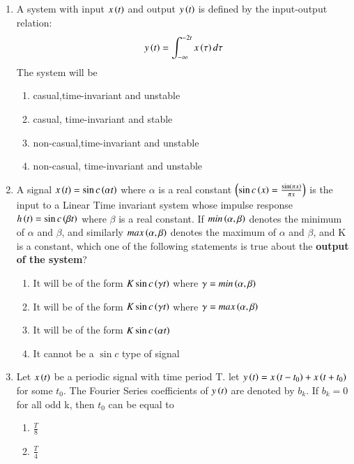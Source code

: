 \documentclass[journal,12pt,onecolumn]{IEEEtran}
\theoremstyle{remark}
\begin{document}
\begin{enumerate}
\begin{enumerate}
      \end{enumerate}
      \item A system with input $x\left(t\right)$ and output $y\left(t\right)$ is defined by the input-output relation:
      \begin{align}
          y\left(t\right)=\int_{-\infty}^{-2t}x\left(\tau\right)d\tau
      \end{align}
      The system will be 
      \begin{enumerate}
          \item casual,time-invariant and unstable
          \item casual, time-invariant and stable
          \item non-casual,time-invariant and unstable
          \item non-casual, time-invariant and unstable
      \end{enumerate}
      \item A signal $x\left(t\right)=\sin c\left(\alpha t\right)$ where $\alpha$ is a real constant $\left(\sin c\left(x\right)=\frac{\sin\left(\pi x\right)}{\pi x}\right)$ is the input to a Linear Time invariant system whose impulse response $h\left(t\right)=\sin c\left(\beta t\right)$ where $\beta$ is a real constant. If $min\left(\alpha,\beta\right)$ denotes the minimum of $\alpha$ and $\beta$, and similarly $max\left(\alpha,\beta\right)$ denotes the maximum of $\alpha$ and $\beta$, and K is a constant, which one of the following statements is true about the \textbf{output of the system}?
      \begin{enumerate}
          \item It will be of the form $K\sin c\left(\gamma t\right)$ where $\gamma=min\left(\alpha,\beta\right)$
           \item It will be of the form $K\sin c\left(\gamma t\right)$ where $\gamma=max\left(\alpha,\beta\right)$
           \item It will be of the form $K \sin c\left(\alpha t\right)$
           \item It cannot be a $\sin c$ type of signal
      \end{enumerate}
      \item Let $x\left(t\right)$ be  a periodic signal with time period T. let $y\left(t\right)=x\left(t-t_0\right)+x\left(t+t_0\right)$ for some $t_0$. The Fourier Series coefficients of $y\left(t\right)$ are denoted by $b_k$. If $b_k=0$ for all odd k, then $t_0$ can be equal to 
      \begin{enumerate}
          \item $\frac{T}{8}$
          \item $\frac{T}{4}$

\end{enumerate}
\end{enumerate}
\end{document}
